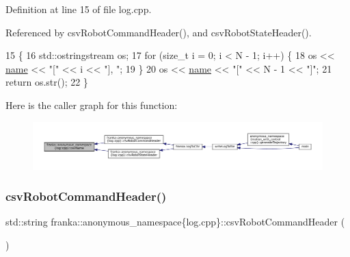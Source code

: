 Definition at line 15 of file log.\+cpp.



Referenced by csv\+Robot\+Command\+Header(), and csv\+Robot\+State\+Header().


\begin{DoxyCode}
15                                                                   \{
16   std::ostringstream os;
17   \textcolor{keywordflow}{for} (\textcolor{keywordtype}{size\_t} i = 0; i < N - 1; i++) \{
18     os << \hyperlink{namespaceinteractive__marker_a447655961b3d3ca3c5a2a9d3d769436d}{name} << \textcolor{stringliteral}{"["} << i << \textcolor{stringliteral}{"], "};
19   \}
20   os << \hyperlink{namespaceinteractive__marker_a447655961b3d3ca3c5a2a9d3d769436d}{name} << \textcolor{stringliteral}{"["} << N - 1 << \textcolor{stringliteral}{"]"};
21   \textcolor{keywordflow}{return} os.str();
22 \}
\end{DoxyCode}
Here is the caller graph for this function\+:
\nopagebreak
\begin{figure}[H]
\begin{center}
\leavevmode
\includegraphics[width=350pt]{namespacefranka_1_1anonymous__namespace_02log_8cpp_03_afa84e09d4799d45ad094a8e4c2ad4c72_icgraph}
\end{center}
\end{figure}
\mbox{\label{namespacefranka_1_1anonymous__namespace_02log_8cpp_03_a2d7829c373ff68580a65cc5a48a2fd32}} 
\subsubsection{\texorpdfstring{csv\+Robot\+Command\+Header()}{csvRobotCommandHeader()}}
{\footnotesize\ttfamily std\+::string franka\+::anonymous\+\_\+namespace\{log.\+cpp\}\+::csv\+Robot\+Command\+Header (\begin{DoxyParamCaption}{ }\end{DoxyParamCaption})}



